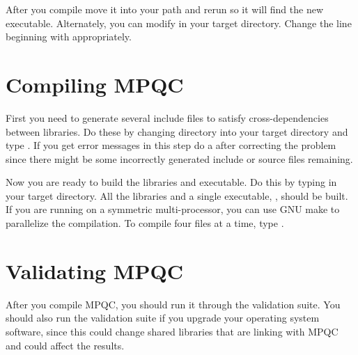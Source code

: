  After you compile  move it into your path and
rerun  so it will find the new executable.  Alternately,
you can modify  in your target directory.
Change the line beginning with  appropriately.

\section{Compiling MPQC}

 First you need to generate several include files to satisfy
cross-dependencies between libraries.  Do these by changing directory into
your target directory and type .  If you get error
messages in this step do a  after correcting the
problem since there might be some incorrectly generated include or source
files remaining.

 Now you are ready to build the libraries and executable.  Do this
by typing  in your target directory.  All the libraries and
a single executable, , should be built.
If you are running on a symmetric multi-processor, you can use GNU
make to parallelize the compilation.  To compile four files at a time,
type .

\section{Validating MPQC}

 After you compile MPQC, you should run it through the validation suite.
You should also run the validation suite if you upgrade your operating
system software, since this could change shared libraries that are linking
with MPQC and could affect the results.

